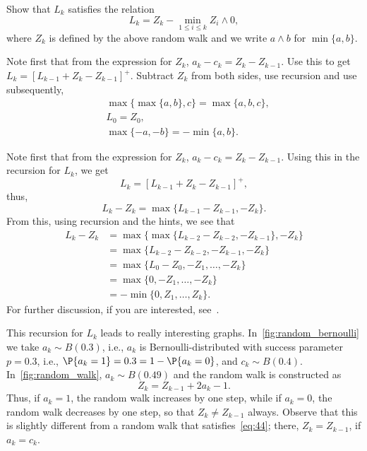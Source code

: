 \begin{exercise}
Show that $L_k$ satisfies the relation
\begin{equation}\label{eq:reich1}
 L_k = Z_k - \min_{1\leq i \leq k} Z_i\wedge 0,
\end{equation}
where $Z_k$ is defined by the above random walk and
we write $a\wedge b$ for $\min\{a,b\}$.
\begin{hint}
Note first that from the expression for $Z_k$,
 $a_k - c_k = Z_k - Z_{k-1}$. Use this to get
 $L_k = [L_{k-1} +Z_k- Z_{k-1}]^+$. Subtract $Z_k$ from both sides, use recursion and
 use subsequently,
\begin{align*}
&\max\{\max\{a,b\}, c\} = \max\{a,b,c\}, \\
&L_0 = Z_0, \\
&\max\{-a, -b \} = -\min\{a,b\}.
\end{align*}
\end{hint}
\begin{solution}
Note first that from the expression
for $Z_k$, $a_k - c_k = Z_k - Z_{k-1}$. Using this in the recursion
for $L_k$, we get
\begin{equation*}
 L_k = [L_{k-1} +Z_k- Z_{k-1}]^+,
\end{equation*}
thus, 
\begin{equation*}
 L_k - Z_{k} = \max\{L_{k-1} - Z_{k-1}, -Z_k\}.
\end{equation*}
From this, using recursion and the hints, we see that
\begin{equation*}
 \begin{split}
 L_k - Z_{k} 
&= \max\{\max\{L_{k-2} - Z_{k-2}, -Z_{k-1}\}, -Z_k\} \\
&= \max\{L_{k-2} - Z_{k-2}, -Z_{k-1}, -Z_k\} \\
&= \max\{L_{0} - Z_{0}, -Z_1, \ldots, -Z_k\} \\
&= \max\{0, -Z_1, \ldots, -Z_k\} \\
&= - \min\{0, Z_1, \ldots, Z_k\}.
 \end{split}
 \end{equation*}
 For further discussion, if you are interested, see~\citet{baccelli88:_sampl_m_m}.
\end{solution}
\end{exercise}

This recursion for $L_k$ leads to really interesting graphs.
In~\cref{fig:random_bernoulli} we take $a_k \sim B(0.3)$, i.e., $a_k$ is Bernoulli-distributed with success parameter $p=0.3$, i.e., $\P{a_k = 1} = 0.3 = 1- \P{a_k=0}$, and $c_k \sim B(0.4)$.
In~\cref{fig:random_walk}, $a_k\sim B(0.49)$ and the random walk is constructed as
\begin{equation}\label{eq:51}
 Z_k = Z_{k-1} + 2 a_k -1.
\end{equation}
Thus, if $a_k=1$, the random walk increases by one step, while if $a_k=0$, the random walk decreases by one step, so that $Z_k \neq Z_{k-1}$ always. Observe that this is slightly different from a random walk that satisfies~\cref{eq:44}; there, $Z_{k}=Z_{k-1}$, if $a_k=c_k$.


